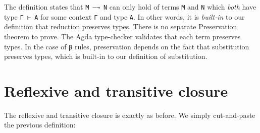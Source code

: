 The definition states that \texttt{M\ —→\ N} can only hold of terms
\texttt{M} and \texttt{N} which \emph{both} have type \texttt{Γ\ ⊢\ A}
for some context \texttt{Γ} and type \texttt{A}. In other words, it is
\emph{built-in} to our definition that reduction preserves types. There
is no separate Preservation theorem to prove. The Agda type-checker
validates that each term preserves types. In the case of \texttt{β}
rules, preservation depends on the fact that substitution preserves
types, which is built-in to our definition of substitution.

\hypertarget{reflexive-and-transitive-closure}{%
\section{Reflexive and transitive
closure}\label{reflexive-and-transitive-closure}}

The reflexive and transitive closure is exactly as before. We simply
cut-and-paste the previous definition:

